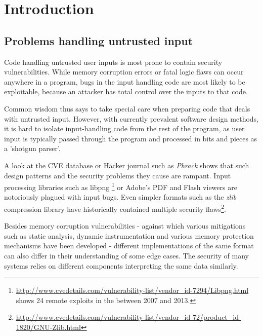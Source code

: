 \section{Introduction}




\subsection{Problems handling untrusted input}
Code handling untrusted user inputs is most prone to contain security vulnerabilities. While memory
corruption errors or fatal logic flaws can occur anywhere in a program, bugs in the input handling
code are most likely to be exploitable, because an attacker has total control over the inputs to
that code. 

Common wisdom thus says to take special care when preparing code that deals with untrusted input.
However, with currently prevalent software design methods, it is hard to isolate input-handling code
from the rest of the program, as user input is typically passed through the program and processed in
bits and pieces as a 'shotgun parser'\cite{shotgun-parser}.  

A look at the CVE database or Hacker journal such as \textit{Phrack} shows that such design patterns
and the security problems they cause are rampant. Input processing libraries such as libpng
\footnote{\url{http://www.cvedetails.com/vulnerability-list/vendor_id-7294/Libpng.html} shows 24
remote exploits in the between 2007 and 2013.} or Adobe's PDF and Flash viewers are notoriously
plagued with input bugs. Even simpler formats such as the \textit{zlib} compression library have
historically contained multiple security
flaws\footnote{\url{http://www.cvedetails.com/vulnerability-list/vendor_id-72/product_id-1820/GNU-Zlib.html}}.

Besides memory corruption vulnerabilities - against which various mitigations such as static
analysis, dynamic instrumentation and various memory protection mechanisms have been developed -
different implementations of the same format can also differ in their understanding of some edge
cases. The security of many systems relies on different components interpreting the same data
similarly.

